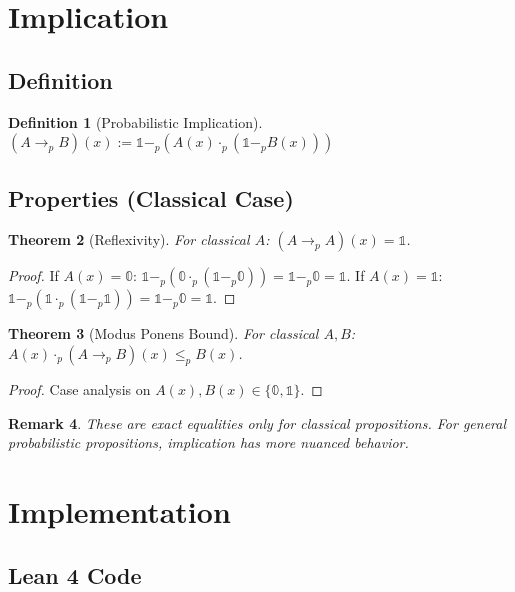\documentclass[11pt,a4paper]{article}
\newtheorem{theorem}{Theorem}[section]
\newtheorem{definition}[theorem]{Definition}
\newtheorem{remark}[theorem]{Remark}
\newcommand{\pzero}{\mathbb{0}}
\newcommand{\pone}{\mathbb{1}}
\newcommand{\ple}{\leq_p}
\newcommand{\pmul}{\cdot_p}
\newcommand{\psub}{-_p}
\begin{document}
\section{Implication}

\subsection{Definition}

\begin{definition}[Probabilistic Implication]
$(A \to_p B)(x) := \pone \psub (A(x) \pmul (\pone \psub B(x)))$
\end{definition}

\subsection{Properties (Classical Case)}

\begin{theorem}[Reflexivity]
For classical $A$: $(A \to_p A)(x) = \pone$.
\end{theorem}

\begin{proof}
If $A(x) = \pzero$: $\pone \psub (\pzero \pmul (\pone \psub \pzero)) = \pone \psub \pzero = \pone$.
If $A(x) = \pone$: $\pone \psub (\pone \pmul (\pone \psub \pone)) = \pone \psub \pzero = \pone$.
\end{proof}

\begin{theorem}[Modus Ponens Bound]
For classical $A, B$: $A(x) \pmul (A \to_p B)(x) \ple B(x)$.
\end{theorem}

\begin{proof}
Case analysis on $A(x), B(x) \in \{\pzero, \pone\}$.
\end{proof}

\begin{remark}
These are exact equalities only for classical propositions. For general probabilistic propositions, implication has more nuanced behavior.
\end{remark}

\section{Implementation}

\subsection{Lean 4 Code}
\end{document}

